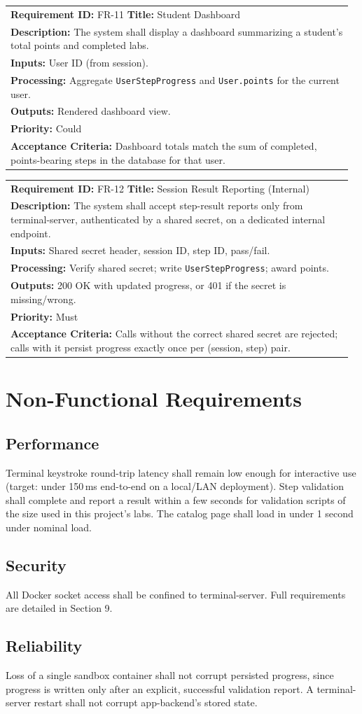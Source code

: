 \documentclass[11pt]{article}
\makeatletter
\newcommand{\frcard}[8]{%
  \par\noindent
  \begin{tabular}{@{}p{0.97\linewidth}@{}}
  \small
  \textbf{Requirement ID:} #1 \quad\textbf{Title:} #2\\[2pt]
  \textbf{Description:} #3\\[2pt]
  \textbf{Inputs:} #4\\[2pt]
  \textbf{Processing:} #5\\[2pt]
  \textbf{Outputs:} #6\\[2pt]
  \textbf{Priority:} #7\\[2pt]
  \textbf{Acceptance Criteria:} #8
  \end{tabular}
  \par\vspace{4mm}
}
\makeatother
\begin{document}
\frcard{FR-11}{Student Dashboard}
 {The system shall display a dashboard summarizing a student's total
 points and completed labs.}
 {User ID (from session).}
 {Aggregate \texttt{UserStepProgress} and \texttt{User.points} for the
 current user.}
 {Rendered dashboard view.}
 {Could}
 {Dashboard totals match the sum of completed, points-bearing steps in
 the database for that user.}

\frcard{FR-12}{Session Result Reporting (Internal)}
 {The system shall accept step-result reports only from
 terminal-server, authenticated by a shared secret, on a dedicated
 internal endpoint.}
 {Shared secret header, session ID, step ID, pass/fail.}
 {Verify shared secret; write \texttt{UserStepProgress}; award
 points.}
 {200 OK with updated progress, or 401 if the secret is missing/wrong.}
 {Must}
 {Calls without the correct shared secret are rejected; calls with it
 persist progress exactly once per (session, step) pair.}

\section{Non-Functional Requirements}

\subsection{Performance}
Terminal keystroke round-trip latency shall remain low enough for
interactive use (target: under 150\,ms end-to-end on a local/LAN
deployment). Step validation shall complete and report a result within
a few seconds for validation scripts of the size used in this
project's labs. The catalog page shall load in under 1 second under
nominal load.

\subsection{Security}
All Docker socket access shall be confined to terminal-server. Full
requirements are detailed in Section 9.

\subsection{Reliability}
Loss of a single sandbox container shall not corrupt persisted
progress, since progress is written only after an explicit, successful
validation report. A terminal-server restart shall not corrupt
app-backend's stored state.
\end{document}
